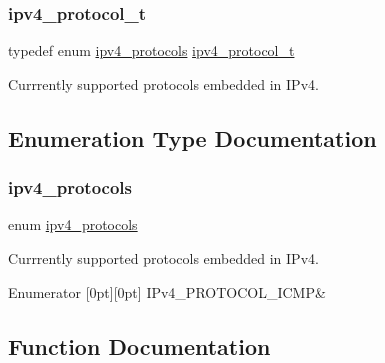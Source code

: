 \subsubsection{\texorpdfstring{ipv4\_protocol\_t}{ipv4\_protocol\_t}}
{\footnotesize\ttfamily typedef enum \mbox{\hyperlink{group__ipv4_gacbfe55abe1d01bf1da8b66868f8135aa}{ipv4\+\_\+protocols}} \mbox{\hyperlink{group__ipv4_gaf689af7304e282d1606e70bf56cbc3d4}{ipv4\+\_\+protocol\+\_\+t}}}



Currrently supported protocols embedded in I\+Pv4. 



\subsection{Enumeration Type Documentation}
\mbox{\label{group__ipv4_gacbfe55abe1d01bf1da8b66868f8135aa}} 
\subsubsection{\texorpdfstring{ipv4\_protocols}{ipv4\_protocols}}
{\footnotesize\ttfamily enum \mbox{\hyperlink{group__ipv4_gacbfe55abe1d01bf1da8b66868f8135aa}{ipv4\+\_\+protocols}}}



Currrently supported protocols embedded in I\+Pv4. 

\begin{DoxyEnumFields}{Enumerator}
[0pt][0pt]{}\mbox{\label{group__ipv4_ggacbfe55abe1d01bf1da8b66868f8135aaa9190ff825ad5c7929c62ed0ce199fc19}} 
I\+Pv4\+\_\+\+P\+R\+O\+T\+O\+C\+O\+L\+\_\+\+I\+C\+MP&\\
\hline

\end{DoxyEnumFields}


\subsection{Function Documentation}
\mbox{\label{group__ipv4_gabf86b43adee57be777cf22f4cddc0b38}} 
